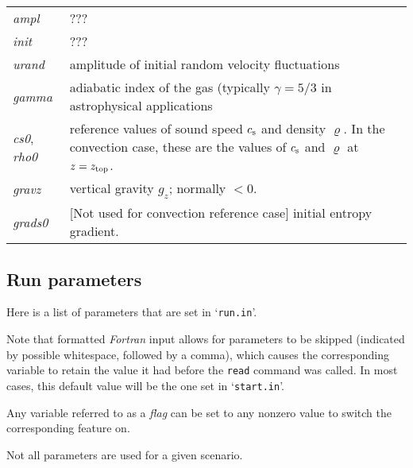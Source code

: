 \documentclass[12pt,twoside,notitlepage,a4paper]{article}
\makeatletter
\newcommand{\code}[1]{\texttt{#1}}
\newcommand{\var}[1]{\textsl{#1}\index{#1@\emph{#1}}\/}
\newcommand{\file}[1]{`\texttt{#1}'}
\newcommand{\command}[1]{\code{#1}\index{#1}}
\newcommand{\cmd}[1]{\command{#1}}
\newcommand{\dfn}[1]{\textsl{#1}\index{#1}\/}
\newcommand{\name}[1]{\textsl{#1}\index{#1}\/}
\newcommand{\cs}            {c_{\rm s}}
\makeatother
\begin{document}
\begin{longtable}{lp{}}
  \var{ampl}   & ??? \\
  \var{init}   & ??? \\
  \var{urand}  & amplitude of initial random velocity fluctuations \\
  \var{gamma}  & adiabatic index of the gas (typically $\gamma=5/3$ in
                 astrophysical applications \\
  \var{cs0}, \var{rho0}
               & reference values of sound speed $\cs$ and density
                 $\varrho$. In the convection case, these are the values of
                 $\cs$ and $\varrho$ at $z=z_{\rm top}$. \\
  \var{gravz}  & vertical gravity $g_z$; normally $<0$. \\
  \var{grads0} & [Not used for convection reference case] initial entropy
                 gradient. \\
\bottomrule
\end{longtable}


\subsection{Run parameters}
\label{Run-params}

Here is a list of parameters that are set in \file{run.in}.

Note that formatted \name{Fortran} input allows for parameters to be
skipped (indicated by possible whitespace, followed by a comma), which
causes the corresponding variable to retain the value it had before the
\cmd{read} command was called.
In most cases, this default value will be the one set in \file{start.in}.

Any variable referred to as a \dfn{flag} can be set to any nonzero value
to switch the corresponding feature on.

Not all parameters are used for a given scenario.
\end{document}

